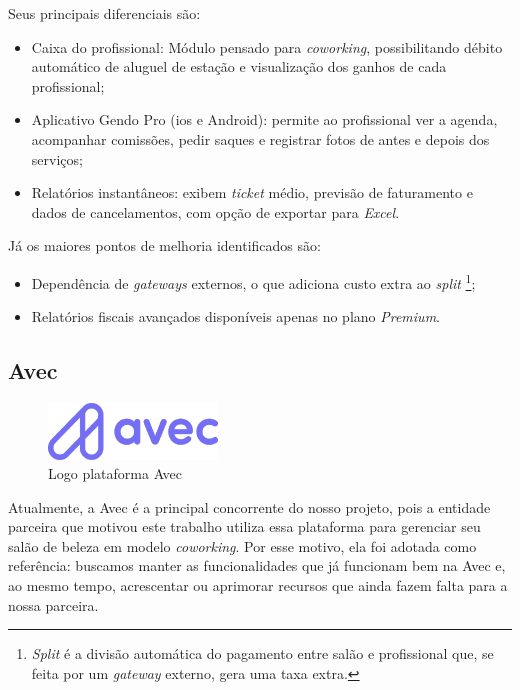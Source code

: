 Seus principais diferenciais são:
\begin{itemize}
	\item Caixa do profissional: Módulo pensado para \emph{coworking}, possibilitando débito automático de aluguel de estação e visualização dos ganhos de cada profissional;
	\item Aplicativo Gendo Pro (\gls{ios} e Android): permite ao profissional ver a agenda, acompanhar comissões, pedir saques e registrar fotos de antes e depois dos serviços;
	\item Relatórios instantâneos: exibem \emph{ticket} médio, previsão de faturamento e dados de cancelamentos, com opção de exportar para \emph{Excel}.
\end{itemize}


Já os maiores pontos de melhoria identificados são:
\begin{itemize}
	\item Dependência de \emph{gateways} externos, o que adiciona custo extra ao \emph{split} \footnote{\emph{Split} é a divisão automática do pagamento entre salão e profissional que, se feita por um \emph{gateway} externo, gera uma taxa extra.};
	\item Relatórios fiscais avançados disponíveis apenas no plano \emph{Premium}.
\end{itemize}

\subsection{Avec}

\begin{figure}[htb]
	\centering
	\includegraphics[width=0.4\textwidth]{cap01-Introducao/Images/1.4.3_Avec}
	\caption{Logo plataforma Avec}
	\label{fig:Avec}
\end{figure}

 \FloatBarrier

Atualmente, a Avec é a principal concorrente do nosso projeto, pois a entidade parceira que motivou este trabalho utiliza essa plataforma para gerenciar seu salão de beleza em modelo \emph{coworking}. Por esse motivo, ela foi adotada como referência: buscamos manter as funcionalidades que já funcionam bem na Avec e, ao mesmo tempo, acrescentar ou aprimorar recursos que ainda fazem falta para a nossa parceira.

